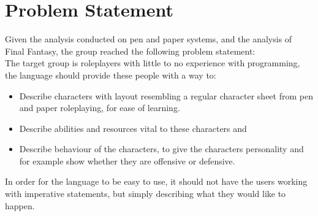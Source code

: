 \newpage
\section{Problem Statement}
Given the analysis conducted on pen and paper systems, and the analysis of Final Fantasy, the group reached the following problem statement:
\\
The target group is roleplayers with little to no experience with programming, the language should provide these people with a way to:
\begin{itemize}
\item Describe characters with layout resembling a regular character sheet from pen and paper roleplaying, for ease of learning.
\item Describe abilities and resources vital to these characters and
\item Describe behaviour of the characters, to give the characters personality and for example show whether they are offensive or defensive.
\end{itemize}

In order for the language to be easy to use, it should not have the users working with imperative statements, but simply describing what they would like to happen.